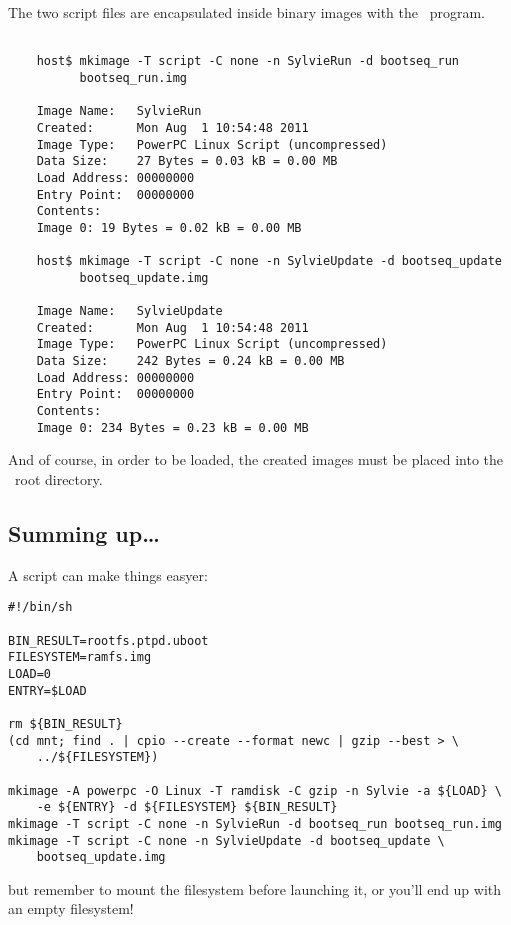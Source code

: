         The two script files are encapsulated inside binary images with
        the \mkimage\ program.
\begin{lstlisting}

    host$ mkimage -T script -C none -n SylvieRun -d bootseq_run
          bootseq_run.img

    Image Name:   SylvieRun
    Created:      Mon Aug  1 10:54:48 2011
    Image Type:   PowerPC Linux Script (uncompressed)
    Data Size:    27 Bytes = 0.03 kB = 0.00 MB
    Load Address: 00000000
    Entry Point:  00000000
    Contents:
    Image 0: 19 Bytes = 0.02 kB = 0.00 MB

    host$ mkimage -T script -C none -n SylvieUpdate -d bootseq_update
          bootseq_update.img

    Image Name:   SylvieUpdate
    Created:      Mon Aug  1 10:54:48 2011
    Image Type:   PowerPC Linux Script (uncompressed)
    Data Size:    242 Bytes = 0.24 kB = 0.00 MB
    Load Address: 00000000
    Entry Point:  00000000
    Contents:
    Image 0: 234 Bytes = 0.23 kB = 0.00 MB

\end{lstlisting}

        And of course, in order to be loaded, the created images must be
        placed into the \TFTP\ root directory.

\subsection{Summing up\dots}

    A script can make things easyer:
\begin{lstlisting}
#!/bin/sh

BIN_RESULT=rootfs.ptpd.uboot
FILESYSTEM=ramfs.img
LOAD=0
ENTRY=$LOAD

rm ${BIN_RESULT}
(cd mnt; find . | cpio --create --format newc | gzip --best > \
    ../${FILESYSTEM})

mkimage -A powerpc -O Linux -T ramdisk -C gzip -n Sylvie -a ${LOAD} \
    -e ${ENTRY} -d ${FILESYSTEM} ${BIN_RESULT}
mkimage -T script -C none -n SylvieRun -d bootseq_run bootseq_run.img
mkimage -T script -C none -n SylvieUpdate -d bootseq_update \
    bootseq_update.img
\end{lstlisting}
    but remember to mount the filesystem before launching it, or you'll
    end up with an empty filesystem!
